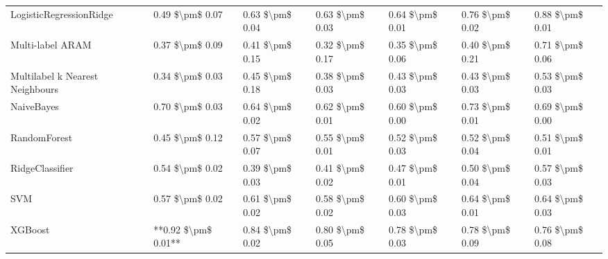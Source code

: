 \begin{tabular}{lllllll}
        LogisticRegressionRidge &     0.49 \$\textbackslash pm\$ 0.07 &           0.63 \$\textbackslash pm\$ 0.04 &       0.63 \$\textbackslash pm\$ 0.03 &        0.64 \$\textbackslash pm\$ 0.01 &                         0.76 \$\textbackslash pm\$ 0.02 & 0.88 \$\textbackslash pm\$ 0.01 \\
               Multi-label ARAM &     0.37 \$\textbackslash pm\$ 0.09 &           0.41 \$\textbackslash pm\$ 0.15 &       0.32 \$\textbackslash pm\$ 0.17 &        0.35 \$\textbackslash pm\$ 0.06 &                         0.40 \$\textbackslash pm\$ 0.21 & 0.71 \$\textbackslash pm\$ 0.06 \\
Multilabel k Nearest Neighbours &     0.34 \$\textbackslash pm\$ 0.03 &           0.45 \$\textbackslash pm\$ 0.18 &       0.38 \$\textbackslash pm\$ 0.03 &        0.43 \$\textbackslash pm\$ 0.03 &                         0.43 \$\textbackslash pm\$ 0.03 & 0.53 \$\textbackslash pm\$ 0.03 \\
                     NaiveBayes &     0.70 \$\textbackslash pm\$ 0.03 &           0.64 \$\textbackslash pm\$ 0.02 &       0.62 \$\textbackslash pm\$ 0.01 &        0.60 \$\textbackslash pm\$ 0.00 &                         0.73 \$\textbackslash pm\$ 0.01 & 0.69 \$\textbackslash pm\$ 0.00 \\
                   RandomForest &     0.45 \$\textbackslash pm\$ 0.12 &           0.57 \$\textbackslash pm\$ 0.07 &       0.55 \$\textbackslash pm\$ 0.01 &        0.52 \$\textbackslash pm\$ 0.03 &                         0.52 \$\textbackslash pm\$ 0.04 & 0.51 \$\textbackslash pm\$ 0.01 \\
                RidgeClassifier &     0.54 \$\textbackslash pm\$ 0.02 &           0.39 \$\textbackslash pm\$ 0.03 &       0.41 \$\textbackslash pm\$ 0.02 &        0.47 \$\textbackslash pm\$ 0.01 &                         0.50 \$\textbackslash pm\$ 0.04 & 0.57 \$\textbackslash pm\$ 0.03 \\
                            SVM &     0.57 \$\textbackslash pm\$ 0.02 &           0.61 \$\textbackslash pm\$ 0.02 &       0.58 \$\textbackslash pm\$ 0.02 &        0.60 \$\textbackslash pm\$ 0.03 &                         0.64 \$\textbackslash pm\$ 0.01 & 0.64 \$\textbackslash pm\$ 0.03 \\
                        XGBoost & **0.92 \$\textbackslash pm\$ 0.01** &           0.84 \$\textbackslash pm\$ 0.02 &       0.80 \$\textbackslash pm\$ 0.05 &        0.78 \$\textbackslash pm\$ 0.03 &                         0.78 \$\textbackslash pm\$ 0.09 & 0.76 \$\textbackslash pm\$ 0.08 \\
\bottomrule
\end{tabular}
